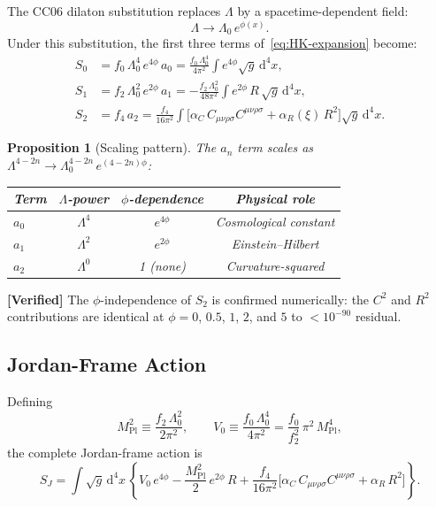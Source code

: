 \documentclass[11pt,a4paper]{article}
\newcommand{\Rsq}{R^2}
\newcommand{\Weylsq}{C_{\mu\nu\rho\sigma}C^{\mu\nu\rho\sigma}}
\renewcommand{\dd}{\mathrm{d}}
\theoremstyle{plain}
\newtheorem{proposition}[theorem]{Proposition}
\theoremstyle{definition}
\newcommand{\verified}[1]{%
  \par\smallskip\noindent
  \colorbox{green!10}{\parbox{\dimexpr\linewidth-2\fboxsep}{%
    \textcolor{green!50!black}{\textbf{[Verified]}} #1}}%
  \par\smallskip}
\begin{document}
The CC06 dilaton substitution replaces $\Lambda$ by a
spacetime-dependent field:
\begin{equation}\label{eq:dilaton-sub}
  \Lambda \to \Lambda_0\,e^{\phi(x)}.
\end{equation}
Under this substitution, the first three terms of~\eqref{eq:HK-expansion}
become:
\begin{align}
  S_0 &= f_0\,\Lambda_0^4\,e^{4\phi}\,a_0
  = \frac{f_0\,\Lambda_0^4}{4\pi^2}
  \int e^{4\phi}\sqrt{g}\,\dd^4x,
  \label{eq:S0}\\[4pt]
  S_1 &= f_2\,\Lambda_0^2\,e^{2\phi}\,a_1
  = -\frac{f_2\,\Lambda_0^2}{48\pi^2}
  \int e^{2\phi}\,R\,\sqrt{g}\,\dd^4x,
  \label{eq:S1}\\[4pt]
  S_2 &= f_4\,a_2
  = \frac{f_4}{16\pi^2}\int\bigl[\alpha_C\,\Weylsq
  + \alpha_R(\xi)\,\Rsq\bigr]\sqrt{g}\,\dd^4x.
  \label{eq:S2}
\end{align}

\begin{proposition}[Scaling pattern]\label{prop:scaling}
The $a_n$ term scales as $\Lambda^{4-2n} \to \Lambda_0^{4-2n}\,e^{(4-2n)\phi}$:
\begin{center}
\begin{tabular}{lccc}
\toprule
Term & $\Lambda$-power & $\phi$-dependence & Physical role \\
\midrule
$a_0$ & $\Lambda^4$ & $e^{4\phi}$ & Cosmological constant \\
$a_1$ & $\Lambda^2$ & $e^{2\phi}$ & Einstein--Hilbert \\
$a_2$ & $\Lambda^0$ & 1 (none) & Curvature-squared \\
\bottomrule
\end{tabular}
\end{center}
\end{proposition}

\verified{The $\phi$-independence of $S_2$ is confirmed numerically:
the $C^2$ and $R^2$ contributions are identical at $\phi = 0$, $0.5$,
$1$, $2$, and $5$ to $< 10^{-90}$ residual.}

\subsection{Jordan-Frame Action}

Defining
\begin{equation}\label{eq:conventions}
  M_{\mathrm{Pl}}^2 \equiv \frac{f_2\,\Lambda_0^2}{2\pi^2},
  \qquad
  V_0 \equiv \frac{f_0\,\Lambda_0^4}{4\pi^2}
  = \frac{f_0}{f_2^2}\,\pi^2\,M_{\mathrm{Pl}}^4,
\end{equation}
the complete Jordan-frame action is
\begin{equation}\label{eq:S-Jordan}
\boxed{
  S_J = \int\!\sqrt{g}\,\dd^4x\,\left\{
  V_0\,e^{4\phi}
  - \frac{M_{\mathrm{Pl}}^2}{2}\,e^{2\phi}\,R
  + \frac{f_4}{16\pi^2}\bigl[\alpha_C\,\Weylsq
    + \alpha_R\,\Rsq\bigr]
  \right\}.
}
\end{equation}
\end{document}
